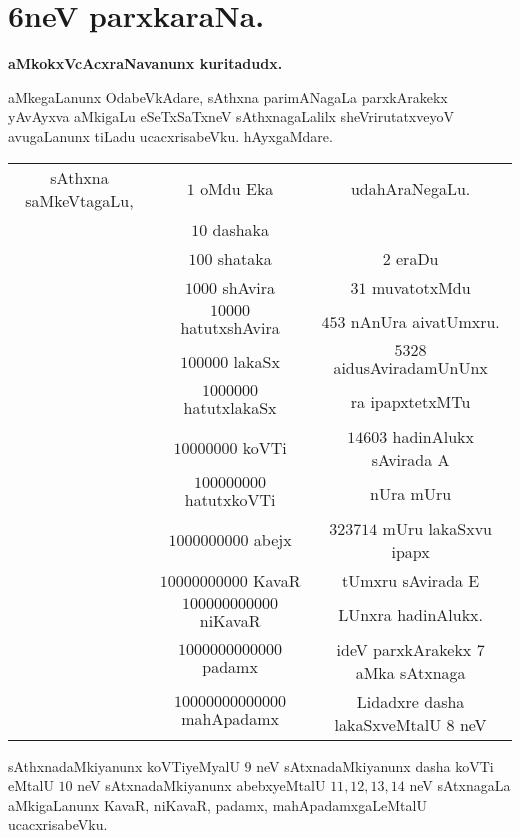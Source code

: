 \chapter{6neV parxkaraNa.}

\centerline{{\large\bf aMkokxVcAcxraNavanunx kuritadudx.}}
\smallskip

aMkegaLanunx OdabeVkAdare, sAthxna parimANagaLa parxkArakekx yAvAyxva aMkigaLu eSeTxSaTxneV sAthxnagaLalilx sheVrirutatxveyoV avugaLanunx tiLadu ucacxrisabeVku. hAyxgaMdare.

\begin{center}
\begin{tabular}{ccc}
sAthxna saMkeVtagaLu, & \quad\quad$1$ oMdu Eka & udahAraNegaLu.\\
& $10$ dashaka & \\
& $100$ shataka & $2$ eraDu\\
& $1000$ shAvira & $31$ muvatotxMdu\\
& $10000$ hatutxshAvira & $453$ nAnUra aivatUmxru.\\
&$100000$ lakaSx & $5328$ aidusAviradamUnUnx \\
& $1000000$ hatutxlakaSx & ra ipapxtetxMTu\\
& $10000000$ koVTi & $14603$ hadinAlukx sAvirada A\\
& $100000000$ hatutxkoVTi & nUra mUru\\
& $1000000000$ abejx & $323714$ mUru lakaSxvu ipapx\\
& $10000000000$ KavaR & tUmxru sAvirada E\\
& $100000000000$ niKavaR & LUnxra hadinAlukx.\\
& $1000000000000$  padamx & ideV parxkArakekx $7$ aMka sAtxnaga\\
& $10000000000000$ mahApadamx & Lidadxre dasha lakaSxveMtalU $8$ neV
\end{tabular}
\end{center}
sAthxnadaMkiyanunx koVTiyeMyalU $9$ neV sAtxnadaMkiyanunx dasha koVTi eMtalU $10$ neV sAtxnadaMkiyanunx abebxyeMtalU $11,12, 13, 14$ neV sAtxnagaLa aMkigaLanunx KavaR, niKavaR, padamx, mahApadamxgaLeMtalU ucacxrisabeVku.   

